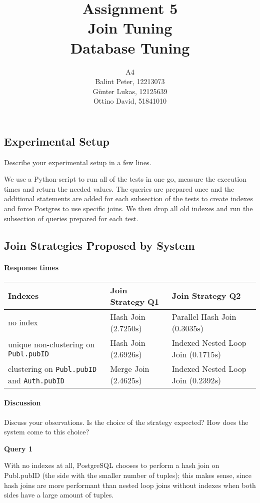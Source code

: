 \documentclass[11pt]{scrartcl}
\title{
  \textbf{\large Assignment 5} \\
  Join Tuning \\
  {\large Database Tuning}}
\author{
  A4 \\
  \large Balint Peter, 12213073 \\
  \large Günter Lukas, 12125639 \\
  \large Ottino David, 51841010
}
\begin{document}
\maketitle

\subsection*{Experimental Setup}

Describe your experimental setup in a few lines.

We use a Python-script to run all of the tests in one go, measure the execution times and return the needed values. The queries are prepared once and the additional statements are added for each subsection of the tests to create indexes and force Postgres to use specific joins. We then drop all old indexes and run the subsection of queries prepared for each test.

\subsection*{Join Strategies Proposed by System}

\paragraph{Response times}\mbox{}

\begin{table}[H]
  \centering
  \begin{tabular}{l|l|l}
    Indexes & Join Strategy Q1 & Join Strategy Q2 \tabularnewline
    \hline
    no index & Hash Join (2.7250s) & Parallel Hash Join (0.3035s) \tabularnewline
    unique non-clustering on \texttt{Publ.pubID} & Hash Join (2.6926s) & Indexed Nested Loop Join (0.1715s)
      \tabularnewline
    clustering on \texttt{Publ.pubID} and \texttt{Auth.pubID} & Merge Join (2.4625s) & Indexed Nested Loop Join (0.2392s)
      \tabularnewline
  \end{tabular}
\end{table}

\paragraph{Discussion}

Discuss your observations. Is the choice of the strategy expected? How does the system come to this choice?

\textbf{Query 1}

With no indexes at all, PostgreSQL chooses to perform a hash join on
Publ.pubID (the side with the smaller number of tuples); this makes
sense, since hash joins are more performant than nested loop joins
without indexes when both sides have a large amount of tuples.
\end{document}
